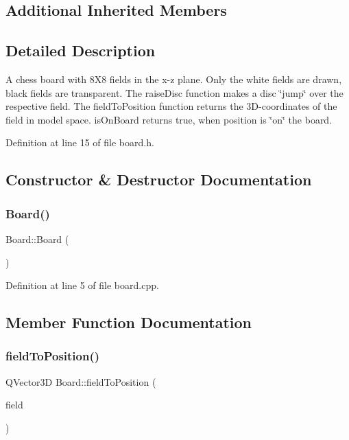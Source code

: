 \subsection*{Additional Inherited Members}


\subsection{Detailed Description}
A chess board with 8X8 fields in the x-\/z plane. Only the white fields are drawn, black fields are transparent. The raise\+Disc function makes a disc \char`\"{}jump\char`\"{} over the respective field. The field\+To\+Position function returns the 3D-\/coordinates of the field in model space. is\+On\+Board returns true, when position is \char`\"{}on\char`\"{} the board. 

Definition at line 15 of file board.\+h.



\subsection{Constructor \& Destructor Documentation}
\mbox{\label{class_board_a9ee491d4fea680cf69b033374a9fdfcb}} 
\subsubsection{\texorpdfstring{Board()}{Board()}}
{\footnotesize\ttfamily Board\+::\+Board (\begin{DoxyParamCaption}{ }\end{DoxyParamCaption})}



Definition at line 5 of file board.\+cpp.



\subsection{Member Function Documentation}
\mbox{\label{class_board_a15ff6efe6bd967a60f6b12ce59e5c27a}} 
\subsubsection{\texorpdfstring{fieldToPosition()}{fieldToPosition()}}
{\footnotesize\ttfamily Q\+Vector3D Board\+::field\+To\+Position (\begin{DoxyParamCaption}\item[{Q\+Point}]{field }\end{DoxyParamCaption})}

